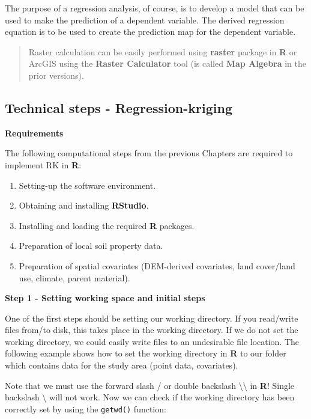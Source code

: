 \documentclass[10pt,b5paper,]{book}
\providecommand{\tightlist}{%
  \setlength{\itemsep}{0pt}\setlength{\parskip}{0pt}}
\theoremstyle{definition}
\theoremstyle{definition}
\theoremstyle{definition}
\theoremstyle{remark}
\begin{document}
The purpose of a regression analysis, of course, is to develop a model
that can be used to make the prediction of a dependent variable. The
derived regression equation is to be used to create the prediction map
for the dependent variable.

\begin{quote}
Raster calculation can be easily performed using \textbf{raster} package
in \textbf{R} or ArcGIS using the \textbf{Raster Calculator} tool (is
called \textbf{Map Algebra} in the prior versions).
\end{quote}

\hypertarget{technical-steps---regression-kriging}{%
\subsection{Technical steps -
Regression-kriging}\label{technical-steps---regression-kriging}}

\textbf{Requirements}

The following computational steps from the previous Chapters are
required to implement RK in \textbf{R}:

\begin{enumerate}
\def\labelenumi{\arabic{enumi}.}
\tightlist
\item
  Setting-up the software environment.
\item
  Obtaining and installing \textbf{RStudio}.
\item
  Installing and loading the required \textbf{R} packages.
\item
  Preparation of local soil property data.
\item
  Preparation of spatial covariates (DEM-derived covariates, land
  cover/land use, climate, parent material).
\end{enumerate}

\textbf{Step 1 - Setting working space and initial steps}

One of the first steps should be setting our working directory. If you
read/write files from/to disk, this takes place in the working
directory. If we do not set the working directory, we could easily write
files to an undesirable file location. The following example shows how
to set the working directory in \textbf{R} to our folder which contains
data for the study area (point data, covariates).

Note that we must use the forward slash / or double backslash
\textbackslash{}\textbackslash{} in \textbf{R}! Single backslash
\textbackslash{} will not work. Now we can check if the working
directory has been correctly set by using the \texttt{getwd()} function:
\end{document}
